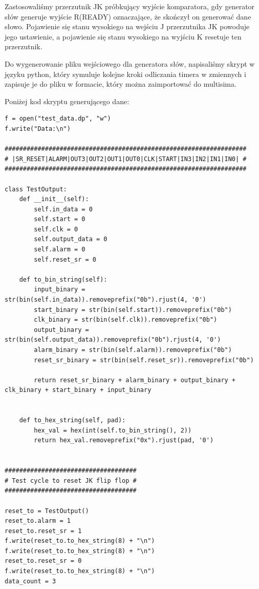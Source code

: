 \documentclass[a4paper]{article}
\begin{document}
Zastosowaliśmy przerzutnik JK próbkujący wyjście komparatora, gdy generator słów generuje wyjście R(READY)
oznaczające, że skończył on generować dane słowo. Pojawienie się stanu wysokiego na wejściu J przerzutnika JK
powoduje jego ustawienie, a pojawienie się stanu wysokiego na wyjściu K resetuje ten przerzutnik.

Do wygenerowanie pliku wejściowego dla generatora słów, napisaliśmy skrypt w języku python, który 
symuluje kolejne kroki odliczania timera w zmiennych i zapisuje je do pliku w formacie, który można zaimportować 
do multisima.

\pagebreak
Poniżej kod skryptu generującego dane:
\small
\begin{verbatim}
f = open("test_data.dp", "w")
f.write("Data:\n")

##################################################################
# |SR_RESET|ALARM|OUT3|OUT2|OUT1|OUT0|CLK|START|IN3|IN2|IN1|IN0| #
##################################################################

class TestOutput: 
    def __init__(self):
        self.in_data = 0
        self.start = 0
        self.clk = 0
        self.output_data = 0
        self.alarm = 0
        self.reset_sr = 0

    def to_bin_string(self):
        input_binary = str(bin(self.in_data)).removeprefix("0b").rjust(4, '0')
        start_binary = str(bin(self.start)).removeprefix("0b")
        clk_binary = str(bin(self.clk)).removeprefix("0b")
        output_binary = str(bin(self.output_data)).removeprefix("0b").rjust(4, '0')
        alarm_binary = str(bin(self.alarm)).removeprefix("0b")
        reset_sr_binary = str(bin(self.reset_sr)).removeprefix("0b")

        return reset_sr_binary + alarm_binary + output_binary + clk_binary + start_binary + input_binary
    

    def to_hex_string(self, pad):
        hex_val = hex(int(self.to_bin_string(), 2))
        return hex_val.removeprefix("0x").rjust(pad, '0')


####################################
# Test cycle to reset JK flip flop #
####################################

reset_to = TestOutput()
reset_to.alarm = 1
reset_to.reset_sr = 1
f.write(reset_to.to_hex_string(8) + "\n")
f.write(reset_to.to_hex_string(8) + "\n")
reset_to.reset_sr = 0
f.write(reset_to.to_hex_string(8) + "\n")
data_count = 3


\end{verbatim}
\end{document}
